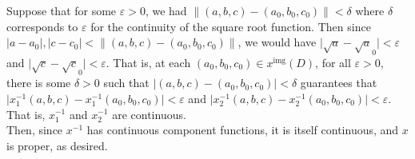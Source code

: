 \documentclass[12 pt, letterpaper]{hmcpset}
\begin{document}
\begin{solution}
\begin{enumerate}
			Suppose that for some $\varepsilon > 0$, we had $\lVert (a, b, c) - (a_{0}, b_{0}, c_{0}) \rVert < \delta$ where $\delta$ corresponds to $\varepsilon$ for the continuity of the square root function. Then since $\lvert a - a_{0} \rvert, \lvert c - c_{0} \rvert < \lVert (a, b, c) - (a_{0}, b_{0}, c_{0}) \rVert$, we would have $\lvert \sqrt a - \sqrt a_{0} \rvert < \varepsilon$ and $\lvert \sqrt c - \sqrt c_{0} \rvert < \varepsilon$. That is, at each $(a_{0}, b_{0}, c_{0}) \in x^{\text{img}}(D)$, for all $\varepsilon > 0$, there is some $\delta > 0$ such that $\lvert (a, b, c) - (a_{0}, b_{0}, c_{0}) \rvert < \delta$ guarantees that $\lvert x_{1}^{-1}(a, b, c) - x_{1}^{-1}(a_{0}, b_{0}, c_{0}) \rvert < \varepsilon$ and $\lvert x_{2}^{-1}(a, b, c) - x_{2}^{-1}(a_{0}, b_{0}, c_{0}) \rvert < \varepsilon$. That is, $x_{1}^{-1}$ and $x_{2}^{-1}$ are continuous. \\

			Then, since $x^{-1}$ has continuous component functions, it is itself continuous, and $x$ is proper, as desired.
	\end{enumerate} 
\end{solution}
\end{document}
